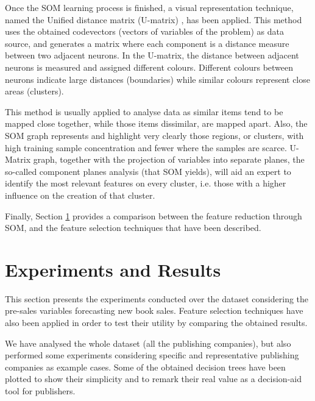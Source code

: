 \documentclass[a4paper,10pt,twocolumn,preprint,3p]{elsarticle}
\begin{document}
Once the SOM learning process is finished, a visual representation technique, 
named the Unified distance matrix (U-matrix) \cite{UmatUlts}, has been applied. 
This method uses the obtained codevectors (vectors of variables of the problem) 
as data source, and generates a matrix where each component is a distance 
measure between two adjacent neurons. In the U-matrix, the distance between 
adjacent neurons is measured and assigned different colours. Different colours 
between neurons indicate large distances (boundaries) while similar colours 
represent close areas (clusters).



This method is usually applied to analyse data as similar items tend to be 
mapped close together, while those items dissimilar, are mapped apart.
Also, the SOM graph represents and highlight very clearly those
regions, or clusters, with high training sample concentration and fewer
where the samples are scarce. U-Matrix graph, together with the projection 
of variables into separate planes, the so-called component planes analysis 
(that SOM yields), will aid an expert to identify the most relevant features 
on every cluster, i.e. those with a higher influence on the creation of that 
cluster.


Finally, Section \ref{sec:experiments} provides a comparison between 
the feature reduction through SOM, and the feature selection techniques 
that have been described.



\section{Experiments and Results}
\label{sec:experiments}

This section presents the experiments conducted over the dataset considering the 
pre-sales variables forecasting new book sales.
Feature selection techniques have also been applied in order to test their utility 
by comparing the obtained results.

We have analysed the whole dataset (all the publishing companies), but also 
performed some experiments considering specific and representative publishing 
companies as example cases.
Some of the obtained decision trees have been plotted to show their simplicity 
and to remark their real value as a decision-aid tool for publishers.
\end{document}
